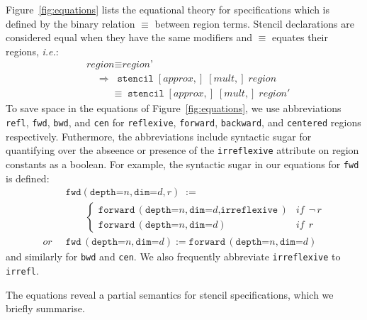 \documentclass[9pt]{sigplanconf}
\theoremstyle{definition}
\newcommand{\ie}{\emph{i.e.}}
\newcommand{\term}[1]{\texttt{#1}}
\newcommand{\stenFwd}[3]{\term{forward} \, (\term{depth=}#1,
  \term{dim=}#2{#3})}
\newcommand{\irrefl}{\texttt{irreflexive}}
\newcommand{\stenFwdS}[2]{\term{fwd} \, (\term{depth=}#1,
  \term{dim=}#2)}
\newcommand{\irreflS}{\texttt{irrefl}}
\newcommand{\stenFwdSR}[3]{\term{fwd} (\term{depth=}#1,
  \term{dim=}#2, #3)}
\begin{document}
Figure~\ref{fig:equations} lists the equational theory for
specifications which is defined by the binary relation $\equiv$
between region terms. Stencil declarations are considered
equal when they have the same modifiers and $\equiv$ equates
their regions, \ie{}:
\begin{align*}
& \textit{region} \equiv \textit{region'} \\
& \quad \Rightarrow \;\; \texttt{stencil} \; [\textit{approx},] \; [\textit{mult},] \;
\textit{region} \\[-0.4em]
& \quad\quad \;\; \equiv \;\texttt{stencil} \; [\textit{approx},] \;
            [\textit{mult},] \; \textit{region}'
\end{align*}
%
To save space in the equations of Figure~\ref{fig:equations}, we use abbreviations
\term{refl}, \term{fwd}, \term{bwd}, and \term{cen} for \term{reflexive},
\term{forward}, \term{backward}, and \term{centered} regions
respectively. Futhermore, the abbreviations include syntactic sugar
for quantifying over the abseence or presence of the \irrefl{}
attribute on region constants as a boolean. For example,
the syntactic sugar in our equations for \term{fwd} is defined:
\begin{align*}
& \stenFwdSR{n}{d}{r}
\; := \; \\[-0.4em]
& \qquad \begin{cases}
\stenFwd{n}{d}{, \irrefl} & \textit{if} \;\, \neg \, r \\
\stenFwd{n}{d}{}  & \textit{if} \;\,  r
\end{cases} \\
\textit{or} \;\;
& \stenFwdS{n}{d} := \stenFwd{n}{d}{}
\end{align*}
%
and similarly for \term{bwd} and \term{cen}.
We also frequently abbreviate \irrefl{} to \irreflS{}.

The equations reveal a partial semantics for stencil
specifications, which we briefly summarise.
\end{document}
